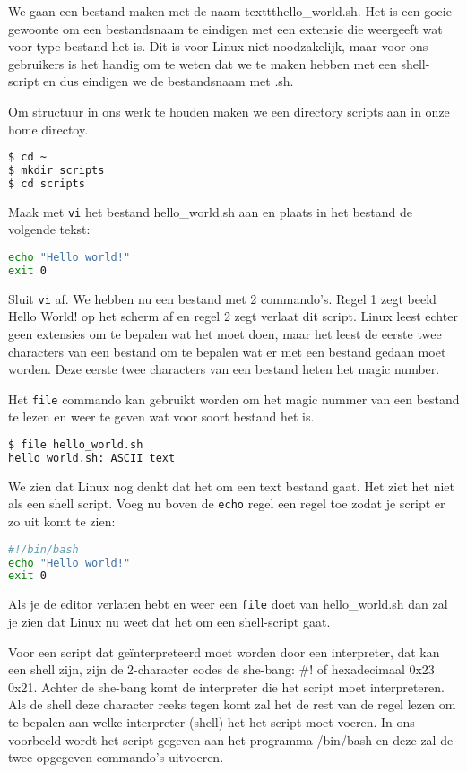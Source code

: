 We gaan een bestand maken met de naam texttt{hello\_world.sh}. Het is een goeie gewoonte om een bestandsnaam te eindigen met een extensie die weergeeft wat voor type bestand het is. Dit is voor Linux niet noodzakelijk, maar voor ons gebruikers is het handig om te weten dat we te maken hebben met een shell-script en dus eindigen we de bestandsnaam met .sh.

Om structuur in ons werk te houden maken we een directory scripts aan in onze home directoy.
\begin{lstlisting}[language=bash]
$ cd ~
$ mkdir scripts
$ cd scripts
\end{lstlisting}
Maak met \texttt{vi} het bestand hello\_world.sh aan en plaats in het bestand de volgende tekst:
\begin{lstlisting}[language=bash]
echo "Hello world!"
exit 0
\end{lstlisting}
Sluit \texttt{vi} af. We hebben nu een bestand met 2 commando's. Regel 1 zegt beeld Hello World! op het scherm af en regel 2 zegt verlaat dit script. Linux leest echter geen extensies om te bepalen wat het moet doen, maar het leest de eerste twee characters van een bestand om te bepalen wat er met een bestand gedaan moet worden. Deze eerste twee characters van een bestand heten het magic number.

Het \texttt{file} commando kan gebruikt worden om het magic nummer van een bestand te lezen en weer te geven wat voor soort bestand het is.
\begin{lstlisting}[language=bash]
$ file hello_world.sh
hello_world.sh: ASCII text
\end{lstlisting}
We zien dat Linux nog denkt dat het om een text bestand gaat. Het ziet het niet als een shell script. Voeg nu boven de \texttt{echo} regel een regel toe zodat je script er zo uit komt te zien:
\begin{lstlisting}[language=bash]
#!/bin/bash
echo "Hello world!"
exit 0
\end{lstlisting}
Als je de editor verlaten hebt en weer een \texttt{file} doet van hello\_world.sh dan zal je zien dat Linux nu weet dat het om een shell-script gaat.

Voor een script dat ge\"interpreteerd moet worden door een interpreter, dat kan een shell zijn, zijn de 2-character codes de she-bang: \#! of hexadecimaal 0x23 0x21. Achter de she-bang komt de interpreter die het script moet interpreteren. Als de shell deze character reeks tegen komt zal het de rest van de regel lezen om te bepalen aan welke interpreter (shell) het het script moet voeren. In ons voorbeeld wordt het script gegeven aan het programma /bin/bash en deze zal de twee opgegeven commando's uitvoeren.

